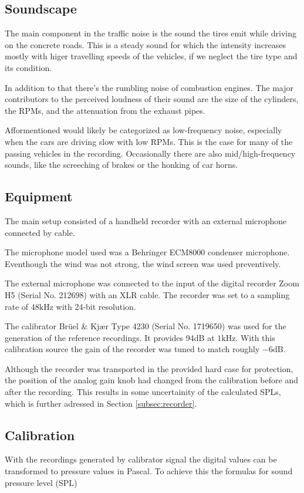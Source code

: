 \documentclass[twocolumn]{article}
\begin{document}
\subsection{Soundscape}
The main component in the traffic noise is the sound the tires emit while driving on the concrete roads.
This is a steady sound for which the intensity increases mostly with higer travelling speeds of the vehicles,
if we neglect the tire type and its condition.

In addition to that there's the rumbling noise of combustion engines.
The major contributors to the perceived loudness of their sound are the size of the cylinders, the RPMs, and
the attenuation from the exhaust pipes.

Afformentioned would likely be categorized as low-frequency noise, especially when the cars are driving slow
with low RPMs.
This is the case for many of the passing vehicles in the recording.
Occasionally there are also mid/high-frequency sounds, like the screeching of brakes or the honking of car horns.

\subsection{Equipment}
The main setup consisted of a handheld recorder with an external microphone connected by cable.

The microphone model used was a Behringer ECM8000 condenser microphone.
Eventhough the wind was not strong, the wind screen was used preventively.

The external microphone was connected to the input of the digital recorder Zoom H5 (Serial No. 212698) with
an XLR cable.
The recorder was set to a sampling rate of $48\textrm{kHz}$ with 24-bit resolution.

The calibrator Brüel \& Kjær Type 4230 (Serial No. 1719650) was used for the generation of the
reference recordings.
It provides 94dB at $1\textrm{kHz}$.
With this calibration source the gain of the recorder was tuned to match roughly $-6\textrm{dB}$.

Although the recorder was transported in the provided hard case for protection, the position of the analog gain
knob had changed from the calibration before and after the recording.
This results in some uncertainity of the calculated SPLs, which is further adressed in Section 
\ref{subsec:recorder}.

\subsection{Calibration}
With the recordings generated by calibrator signal the digital values can be transformed to pressure
values in Pascal.
To achieve this the formulas for sound pressure level (SPL)
\end{document}
